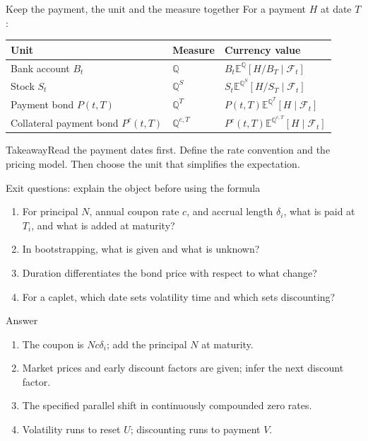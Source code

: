 \documentclass[handout,10pt,t,aspectratio=169]{beamer}
\newenvironment{answerbox}{\begin{exampleblock}{Answer}}{\end{exampleblock}}
\newenvironment{keybox}{\begin{exampleblock}{Takeaway}}{\end{exampleblock}}
\newcommand{\E}{\mathbb E}
\newcommand{\Q}{\mathbb Q}
\newcommand{\F}{\mathcal F}
\begin{document}
\begin{frame}{Keep the payment, the unit and the measure together}
\small
For a payment \(H\) at date \(T\):
\begin{center}\begin{tabular}{L{.22\textwidth}L{.16\textwidth}L{.48\textwidth}}
\toprule Unit & Measure & Currency value\\\midrule
Bank account \(B_t\) & \(\Q\) & \(B_t\E^\Q[H/B_T\mid\F_t]\)\\[.7em]
Stock \(S_t\) & \(\Q^S\) & \(S_t\E^{\Q^S}[H/S_T\mid\F_t]\)\\[.7em]
Payment bond \(P(t,T)\) & \(\Q^T\) & \(P(t,T)\E^{\Q^T}[H\mid\F_t]\)\\[.7em]
Collateral payment bond \(P^c(t,T)\) & \(\Q^{c,T}\) & \(P^c(t,T)\E^{\Q^{c,T}}[H\mid\F_t]\)\\\bottomrule
\end{tabular}\end{center}
\begin{keybox}Read the payment dates first. Define the rate convention and the pricing model.
Then choose the unit that simplifies the expectation.\end{keybox}
\end{frame}

\begin{frame}{Exit questions: explain the object before using the formula}
\small
\begin{enumerate}
\item For principal \(N\), annual coupon rate \(c\), and accrual length
\(\delta_i\), what is paid at \(T_i\), and what is added at maturity?
\item In bootstrapping, what is given and what is unknown?
\item Duration differentiates the bond price with respect to what change?
\item For a caplet, which date sets volatility time and which sets discounting?
\end{enumerate}
\begin{answerbox}
\begin{enumerate}
\item The coupon is \(Nc\delta_i\); add the principal \(N\) at maturity.
\item Market prices and early discount factors are given; infer the next discount factor.
\item The specified parallel shift in continuously compounded zero rates.
\item Volatility runs to reset \(U\); discounting runs to payment \(V\).
\end{enumerate}
\end{answerbox}
\end{frame}
\end{document}
